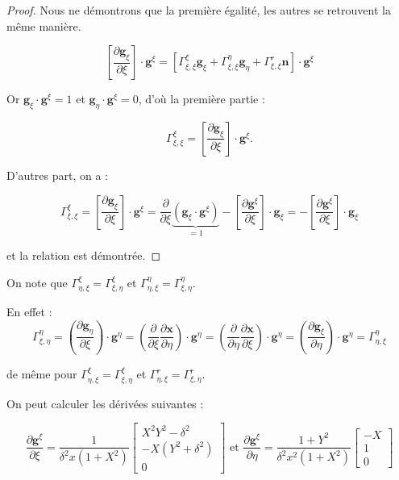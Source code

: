 \begin{proof}
Nous ne démontrons que la première égalité, les autres se retrouvent la même manière.

$$\left[ \dfrac{\partial \mathbf{g}_{\xi}}{\partial \xi} \right] \cdot \mathbf{g}^{\xi} = \left[ \Gamma_{\xi,\xi}^{\xi} \mathbf{g}_{\xi} + \Gamma_{\xi,\xi}^{\eta} \mathbf{g}_{\eta} + \Gamma_{\xi,\xi}^r \mathbf{n}\right] \cdot \mathbf{g}^{\xi}$$

Or $\mathbf{g}_{\xi} \cdot \mathbf{g}^{\xi} = 1$ et $\mathbf{g}_{\eta} \cdot \mathbf{g}^{\xi} = 0$, d'où la première partie :

$$\Gamma_{\xi,\xi}^{\xi} = \left[ \dfrac{\partial \mathbf{g}_{\xi}}{\partial \xi} \right] \cdot \mathbf{g}^{\xi}.$$

D'autres part, on a :

$$\Gamma_{\xi,\xi}^{\xi} = \left[ \dfrac{\partial \mathbf{g}_{\xi}}{\partial \xi} \right] \cdot \mathbf{g}^{\xi} = \dfrac{\partial}{\partial \xi}  \underbrace{\left(\mathbf{g}_{\xi} \cdot \mathbf{g}^{\xi}\right)}_{=1}  - \left[ \dfrac{\partial \mathbf{g}^{\xi}}{\partial \xi}  \right] \cdot \mathbf{g}_{\xi} = - \left[ \dfrac{\partial \mathbf{g}^{\xi}}{\partial \xi}  \right] \cdot \mathbf{g}_{\xi}$$

et la relation est démontrée.
\end{proof}

\begin{remarque}
On note que $\Gamma_{\eta,\xi}^{\xi}=\Gamma_{\xi,\eta}^{\xi}$ et $\Gamma_{\eta,\xi}^{\eta}=\Gamma_{\xi,\eta}^{\eta}$.

En effet :
$$\Gamma_{\xi, \eta}^{\eta} = \left( \dfrac{\partial \mathbf{g}_{\eta}}{\partial \xi} \right) \cdot \mathbf{g}^{\eta} = \left( \dfrac{\partial}{\partial \xi} \dfrac{\partial \mathbf{x}}{\partial \eta} \right) \cdot \mathbf{g}^{\eta} = \left( \dfrac{\partial}{\partial \eta} \dfrac{\partial \mathbf{x}}{\partial \xi} \right) \cdot \mathbf{g}^{\eta} = \left( \dfrac{\partial \mathbf{g}_{\xi}}{\partial \eta} \right) \cdot \mathbf{g}^{\eta} = \Gamma_{\eta, \xi}^{\eta}$$

de même pour $\Gamma_{\eta,\xi}^{\xi}=\Gamma_{\xi,\eta}^{\xi}$ et $\Gamma_{\eta,\xi}^{r}=\Gamma_{\xi,\eta}^{r}$.
\end{remarque}


On peut calculer les dérivées suivantes :

\begin{equation}
\dfrac{\partial \mathbf{g}^{\xi}}{\partial \xi} = \dfrac{1}{\delta^2 x (1+X^2)} \begin{bmatrix}
X^2Y^2 - \delta^2 \\ -X(Y^2+\delta^2) \\ 0
\end{bmatrix}
\text{ et }
\dfrac{\partial \mathbf{g}^{\xi}}{\partial \eta} = \dfrac{1+Y^2}{\delta^2 x^2 (1+X^2)} \begin{bmatrix}
-X \\ 1 \\ 0
\end{bmatrix}
\end{equation}

